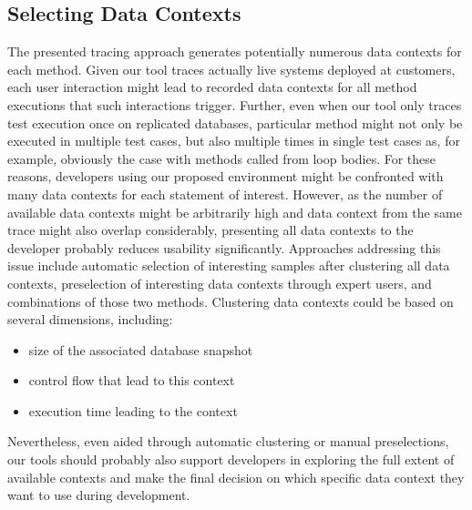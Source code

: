 \subsection{Selecting Data Contexts}
The presented tracing approach generates potentially numerous data contexts for each method.
Given our tool traces actually live systems deployed at customers, each user interaction might lead to recorded data contexts for all method executions that such interactions trigger.
Further, even when our tool only traces test execution once on replicated databases, particular method might not only be executed in multiple test cases, but also multiple times in single test cases as, for example, obviously the case with methods called from loop bodies.
For these reasons, developers using our proposed environment might be confronted with many data contexts for each statement of interest.
However, as the number of available data contexts might be arbitrarily high and data context from the same trace might also overlap considerably, presenting all data contexts to the developer probably reduces usability significantly.
Approaches addressing this issue include automatic selection of interesting samples after clustering all data contexts, preselection of interesting data contexts through expert users, and combinations of those two methods.
Clustering data contexts could be based on several dimensions, including:
\begin{itemize}
  \item size of the associated database snapshot
  \item control flow that lead to this context
  \item execution time leading to the context
\end{itemize}
Nevertheless, even aided through automatic clustering or manual preselections, our tools should probably also support developers in exploring the full extent of available contexts and make the final decision on which specific data context they want to use during development.
